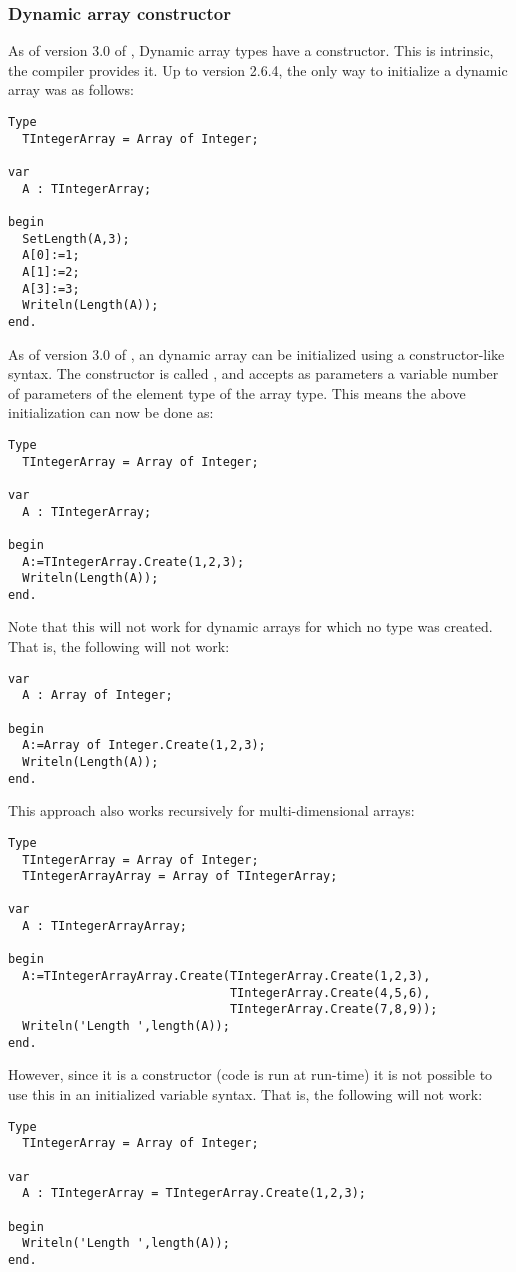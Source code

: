 \subsubsection{Dynamic array constructor}
As of version 3.0 of \fpc, Dynamic array types have a constructor. This is intrinsic, the compiler provides it.
Up to version 2.6.4, the only way to initialize a dynamic array was as follows:
\begin{verbatim}
Type
  TIntegerArray = Array of Integer;
  
var
  A : TIntegerArray;
  
begin
  SetLength(A,3);
  A[0]:=1;
  A[1]:=2;
  A[3]:=3;
  Writeln(Length(A));
end. 
\end{verbatim}
As of version 3.0 of \fpc, an dynamic array can be initialized using a constructor-like syntax. 
The constructor is called , and accepts as parameters a variable number of parameters of the element type of the array type.
This means the above initialization can now be done as:
\begin{verbatim}
Type
  TIntegerArray = Array of Integer;
  
var
  A : TIntegerArray;
  
begin
  A:=TIntegerArray.Create(1,2,3);
  Writeln(Length(A));
end. 
\end{verbatim}
Note that this will not work for dynamic arrays for which no type was created. That is, the following will not work:
\begin{verbatim}
var
  A : Array of Integer;
  
begin
  A:=Array of Integer.Create(1,2,3);
  Writeln(Length(A));
end. 
\end{verbatim}
This approach also works recursively for multi-dimensional arrays:
\begin{verbatim}
Type
  TIntegerArray = Array of Integer;
  TIntegerArrayArray = Array of TIntegerArray;
  
var
  A : TIntegerArrayArray;
  
begin
  A:=TIntegerArrayArray.Create(TIntegerArray.Create(1,2,3),
                               TIntegerArray.Create(4,5,6),
                               TIntegerArray.Create(7,8,9));
  Writeln('Length ',length(A));
end.
\end{verbatim}
However, since it is a constructor (code is run at run-time) it is not possible to use this in an initialized variable syntax. 
That is, the following will not work:
\begin{verbatim}
Type
  TIntegerArray = Array of Integer;

var
  A : TIntegerArray = TIntegerArray.Create(1,2,3);

begin
  Writeln('Length ',length(A));
end.
\end{verbatim}
